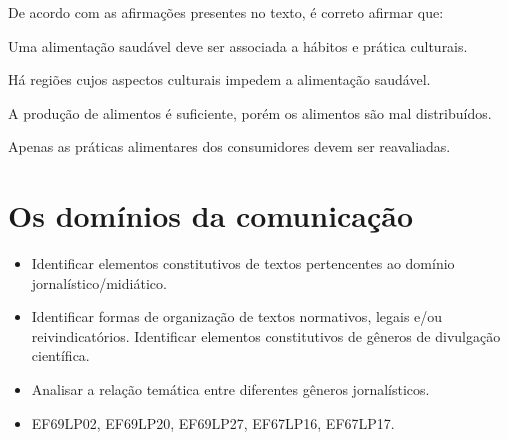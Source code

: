 
De acordo com as afirmações presentes no texto, é correto afirmar que:

\begin{escolha}

  \item Uma alimentação saudável deve ser associada a hábitos e prática culturais.
  
  \item Há regiões cujos aspectos culturais impedem a alimentação saudável.
  
  \item A produção de alimentos é suficiente, porém os alimentos são mal distribuídos.
  
  \item Apenas as práticas alimentares dos consumidores devem ser reavaliadas.

\end{escolha}

\chapter{Os domínios da comunicação}


\begin{itemize}

  \item Identificar elementos constitutivos de textos pertencentes ao
domínio jornalístico/midiático.

  \item Identificar formas de organização de textos normativos, legais e/ou
reivindicatórios. Identificar elementos constitutivos de gêneros de
divulgação científica.

  \item Analisar a relação temática entre diferentes gêneros jornalísticos.

\end{itemize}


\begin{itemize}
  
  \item EF69LP02, EF69LP20, EF69LP27, EF67LP16, EF67LP17.

\end{itemize}

